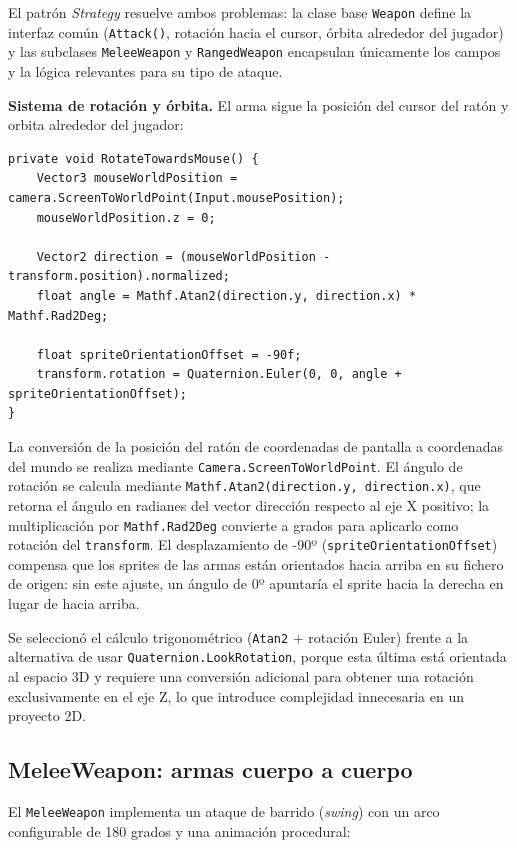 El patrón \textit{Strategy} resuelve ambos problemas: la clase base \texttt{Weapon} define la interfaz común (\texttt{Attack()}, rotación hacia el cursor, órbita alrededor del jugador) y las subclases \texttt{MeleeWeapon} y \texttt{RangedWeapon} encapsulan únicamente los campos y la lógica relevantes para su tipo de ataque.

\textbf{Sistema de rotación y órbita.} El arma sigue la posición del cursor del ratón y orbita alrededor del jugador:

\begin{lstlisting}
private void RotateTowardsMouse() {
    Vector3 mouseWorldPosition = camera.ScreenToWorldPoint(Input.mousePosition);
    mouseWorldPosition.z = 0;
    
    Vector2 direction = (mouseWorldPosition - transform.position).normalized;
    float angle = Mathf.Atan2(direction.y, direction.x) * Mathf.Rad2Deg;
    
    float spriteOrientationOffset = -90f;
    transform.rotation = Quaternion.Euler(0, 0, angle + spriteOrientationOffset);
}
\end{lstlisting}


La conversión de la posición del ratón de coordenadas de pantalla a coordenadas del mundo se realiza mediante \texttt{Camera.ScreenToWorldPoint}. El ángulo de rotación se calcula mediante \texttt{Mathf.Atan2(direction.y, direction.x)}, que retorna el ángulo en radianes del vector dirección respecto al eje X positivo; la multiplicación por \texttt{Mathf.Rad2Deg} convierte a grados para aplicarlo como rotación del \texttt{transform}. El desplazamiento de -90º (\texttt{spriteOrientationOffset}) compensa que los sprites de las armas están orientados hacia arriba en su fichero de origen: sin este ajuste, un ángulo de 0º apuntaría el sprite hacia la derecha en lugar de hacia arriba.

Se seleccionó el cálculo trigonométrico (\texttt{Atan2} + rotación Euler) frente a la alternativa de usar \texttt{Quaternion.LookRotation}, porque esta última está orientada al espacio 3D y requiere una conversión adicional para obtener una rotación exclusivamente en el eje Z, lo que introduce complejidad innecesaria en un proyecto 2D.

\subsection{MeleeWeapon: armas cuerpo a cuerpo}


El \texttt{MeleeWeapon} implementa un ataque de barrido (\textit{swing}) con un arco configurable de 180 grados y una animación procedural:

